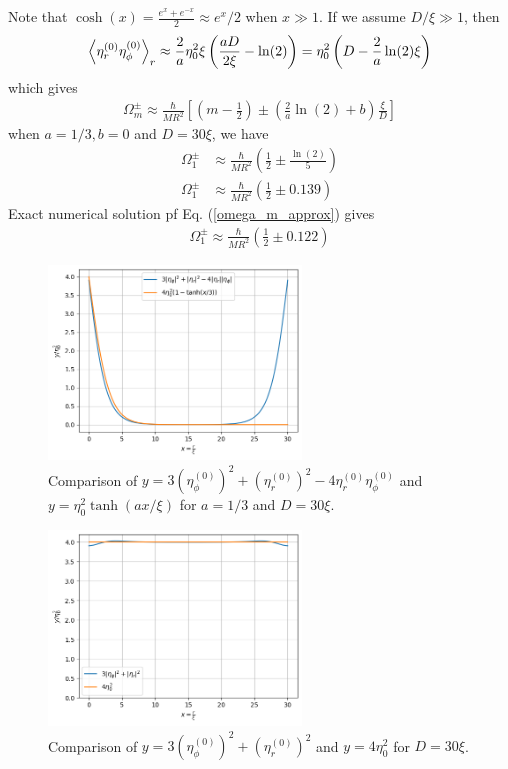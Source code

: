 \documentclass[aps,prl,preprint]{revtex4-2}
\begin{document}
Note that $\cosh(x)=\frac{e^x+e^{-x}}{2}\approx e^x/2$ when $x\gg 1$.
If we assume $D/\xi\gg 1$, then
\begin{align}
    \ev{\eta^{(0)}_r\eta^{(0)}_\phi}_r
    \approx \frac{2}{a}\eta_0^2\xi\left(\frac{aD}{2\xi} - \ln(2)\right)
    = \eta_0^2\left(D - \frac{2}{a}\ln(2)\xi\right)
\end{align}
which gives
\begin{align}
    \Omega_m^\pm \approx \frac{\hbar}{MR^2}\left[\left(m-\frac{1}{2}\right)
        \pm\left(\frac{2}{a}\ln(2)+b\right)\frac{\xi}{D}\right]
\end{align}
when $a=1/3, b=0$ and $D=30\xi$, we have
\begin{align}
    \Omega_1^\pm & \approx \frac{\hbar}{MR^2}\left(\frac{1}{2}\pm\frac{\ln(2)}{5}\right) \\
    \Omega_1^\pm & \approx \frac{\hbar}{MR^2}\left(\frac{1}{2}\pm 0.139\right)
\end{align}
Exact numerical solution pf Eq. (\ref{omega_m_approx}) gives
\begin{align}
    \Omega_1^\pm \approx \frac{\hbar}{MR^2}\left(\frac{1}{2}\pm 0.122\right)
\end{align}

\begin{figure}[h]
    \centering
    \includegraphics[width=0.6\textwidth]{../figures/numerator.png}
    \caption{Comparison of
        $y=3\left(\eta^{(0)}_\phi\right)^2 + \left(\eta^{(0)}_r\right)^2-4\eta^{(0)}_r\eta^{(0)}_\phi$
        and $y=\eta_0^2\tanh(ax/\xi)$ for $a=1/3$ and $D=30\xi$.}
    \label{fig:numerator}
\end{figure}
\begin{figure}[h]
    \centering
    \includegraphics[width=0.6\textwidth]{../figures/denominator.png}
    \caption{Comparison of
        $y=3\left(\eta^{(0)}_\phi\right)^2 + \left(\eta^{(0)}_r\right)^2$
        and $y=4\eta_0^2$ for $D=30\xi$.}
    \label{fig:denominator}
\end{figure}
\end{document}
